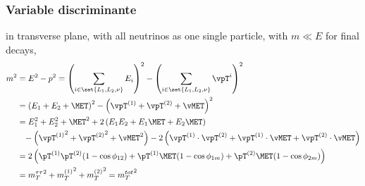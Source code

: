\subsubsection{Variable discriminante}


in transverse plane,
with all neutrinos as one single particle,
with $m\ll E$ for final decays,
\begin{align}
m^2 &= E^2 - p^2
= \left( \sum_{i \in \set{L_1,L_2,\nu}} E_i \right)^2 - \left( \sum_{i \in \set{L_1,L_2,\nu}} \vpT^i \right)^2\\
&= \left( E_1 + E_2 + \MET \right)^2 - \left( \vpT^{(1)} + \vpT^{(2)} + \vMET \right)^2\\
&= E_1^2 + E_2^2 + \MET^2 + 2 \left( E_1E_2 + E_1\MET + E_2\MET \right)\\
&\hphantom{=} - \left( {\vpT^{(1)}}^2 + {\vpT^{(2)}}^2 + {\vMET}^2 \right) - 2 \left( \vpT^{(1)}\cdot\vpT^{(2)} + \vpT^{(1)}\cdot\vMET + \vpT^{(2)}\cdot\vMET \right)\\
&= 2 \left( \pT^{(1)}\pT^{(2)}(1-\cos\phi_{12}) + \pT^{(1)}\MET(1-\cos\phi_{1m}) + \pT^{(2)}\MET(1-\cos\phi_{2m}) \right)\\
&= {m_T^{\tau\tau}}^2 + {m_T^{(1)}}^2 + {m_T^{(2)}}^{2} = {m_T^{tot}}^2
\end{align}
